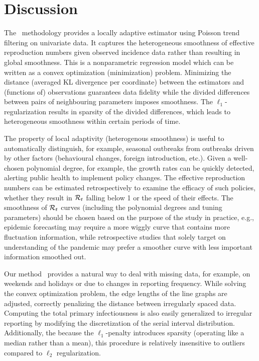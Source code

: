 \section{Discussion}

The \RtEstim\ methodology provides a locally adaptive estimator using Poisson
trend filtering on univariate data. It captures the heterogeneous smoothness of
effective reproduction numbers given observed incidence data rather than
resulting in global smoothness. This is a nonparametric regression model which
can be written as a convex optimization (minimization) problem. Minimizing the
distance (averaged KL divergence per coordinate) between the estimators and
(functions of) observations guarantees data fidelity while the  divided
differences between pairs of neighbouring parameters imposes smoothness. The
$\ell_1$-regularization results in sparsity of the divided differences, which
leads to heterogeneous smoothness within certain periods of time. 

The property of local adaptivity (heterogenous smoothness) is useful to
automatically distinguish, for example, seasonal outbreaks from outbreaks driven
by other factors (behavioural changes, foreign introduction, etc.). Given a
well-chosen polynomial degree, for example,
the growth rates can be quickly detected, alerting public health to implement
policy changes. The effective
reproduction numbers can be estimated retrospectively to examine the efficacy of
such policies, whether they result in $\mathcal{R}_t$ falling below 1 or the speed of
their effects. 
%
The smoothness of $\mathcal{R}_t$ curves (including the polynomial degrees and tuning parameters) 
should be chosen based on the purpose of the study in practice, e.g., epidemic 
forecasting may require a more wiggly curve that contains more fluctuation 
information, while retrospective studies that solely target on understanding of 
the pandemic may prefer a smoother curve with less important information smoothed out. 

Our method \RtEstim\ provides a natural way to deal with missing data, for
example, on weekends and holidays or due to changes in reporting frequency.
While solving the convex optimization problem, the edge lengths of the line
graphs are adjusted, correctly penalizing the distance between irregularly
spaced data. Computing the total
primary infectiousness is also easily generalized to irregular reporting by
modifying the discretization of the serial interval distribution. Additionally,
the because the $\ell_1$-penalty introduces sparsity (operating like a median
rather than a mean), this procedure is relatively insensitive to outliers
compared to $\ell_2$ regularization.


